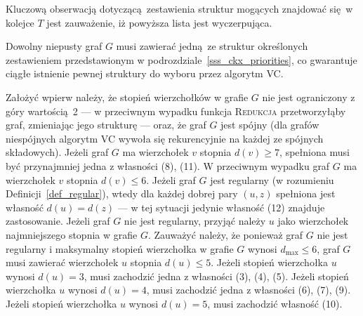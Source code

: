 {  Kluczową obserwacją dotyczącą zestawienia struktur mogących znajdować się w kolejce $T$ jest zauważenie, iż powyższa lista jest wyczerpująca.
  \begin{theorem}
    Dowolny niepusty graf $G$ musi zawierać jedną ze struktur określonych zestawieniem przedstawionym w podrozdziale~\ref{sss_ckx_priorities}, co gwarantuje ciągłe istnienie pewnej struktury do wyboru przez algorytm \textsc{VC}.
  \end{theorem}
  \begin{bproof}
    Założyć wpierw należy, że stopień wierzchołków w grafie $G$ nie jest ograniczony z góry wartością 2 --- w przeciwnym wypadku funkcja \textsc{Redukcja} przetworzyłąby graf, zmieniając jego strukturę --- oraz, że graf $G$ jest spójny (dla grafów niespójnych algorytm \textsc{VC} wywoła się rekurencyjnie na każdej ze spójnych składowych).
    Jeżeli graf $G$ ma wierzchołek $v$ stopnia $d(v) \geq 7$, spełniona musi być przynajmniej jedna z własności (8), (11).
    W przeciwnym wypadku graf $G$ ma wierzchołek $v$ stopnia $d(v) \leq 6$.
    Jeżeli graf $G$ jest regularny (w rozumieniu Definicji~\ref{def_regular}), wtedy dla każdej dobrej pary $(u, z)$ spełniona jest własność $d(u)=d(z)$ --- w tej sytuacji jedynie własność (12) znajduje zastosowanie.
    Jeżeli graf $G$ nie jest regularny, przyjąć należy $u$ jako wierzchołek najmniejszego stopnia w grafie $G$.
    Zauważyć należy, że ponieważ graf $G$ nie jest regularny i maksymalny stopień wierzchołka w grafie $G$ wynosi $d_{\max} \leq 6$, graf $G$ musi zawierać wierzchołek $u$ stopnia $d(u) \leq 5$.
    Jeżeli stopień wierzchołka $u$ wynosi $d(u)=3$, musi zachodzić jedna z własności (3), (4), (5).
    Jeżeli stopień wierzchołka $u$ wynosi $d(u)=4$, musi zachodzić jedna z własności (6), (7), (9).
    Jeżeli stopień wierzchołka $u$ wynosi $d(u)=5$, musi zachodzić własność (10).
  \end{bproof}
}
